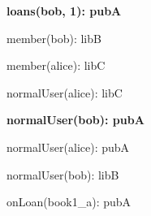 \documentclass{article}
\begin{document}
{\begin{minipage}{\tableWidth}
\begin{description}[align=left,leftmargin=1em,noitemsep,labelsep=\parindent]
\item\textbf{{loans(\allowbreak{}bob, 1): pubA}}
\item{{member(\allowbreak{}bob): libB}}
\item{{member(\allowbreak{}alice): libC}}
\item{{normalUser(\allowbreak{}alice): libC}}
\item\textbf{{normalUser(\allowbreak{}bob): pubA}}
\item{{normalUser(\allowbreak{}alice): pubA}}
\item{{normalUser(\allowbreak{}bob): libB}}
\item{{onLoan(\allowbreak{}book1\_a): pubA}}
\end{description}\end{minipage}}
\end{document}
